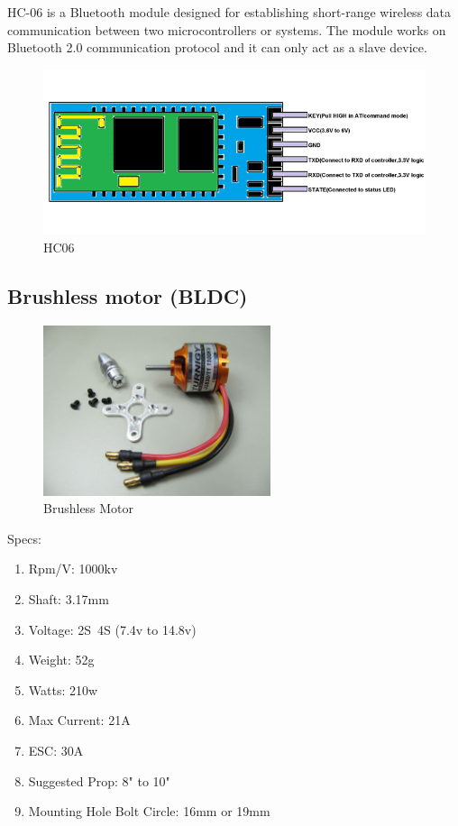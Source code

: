 \documentclass[conference]{IEEEtran}
\begin{document}
HC-06 is a Bluetooth module designed for establishing short-range wireless data communication between two microcontrollers or systems. The module works on Bluetooth 2.0 communication protocol and it can only act as a slave device.
\begin{figure}[th]
    \centering
    \includegraphics[width=\linewidth]{images/HC06-Bluetooth-module-pinout.png}
    \caption{HC06}
    \label{fig:enter-label}
\end{figure}

\subsection{Brushless motor (BLDC)}

\begin{figure}[th]
    \centering
    \includegraphics[height=5cm,width=\linewidth]{images/turnigy-d2830-11-1000kv-brushless-motor-v2-323-p.jpg}
    \caption{Brushless Motor}
    \label{fig:enter-label}
\end{figure}
Specs:
\begin{enumerate}
    \item Rpm/V: 1000kv
    \item Shaft: 3.17mm
    \item Voltage: 2S~4S (7.4v to 14.8v)
    \item Weight: 52g
    \item Watts: 210w
    \item Max Current: 21A
    \item ESC: 30A
    \item Suggested Prop: 8" to 10"
    \item Mounting Hole Bolt Circle: 16mm or 19mm
    
\end{enumerate}
\end{document}
